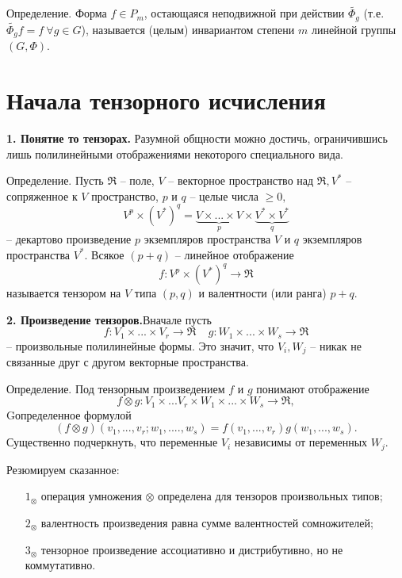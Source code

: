 \documentclass[a4paper, 12pt]{article} %
\begin{document}
Определение. Форма $f \in P_m$, остающаяся неподвижной при действии $\widetilde{\Phi_g}$ (т.е. $\widetilde{\Phi_g}f = f \ \forall g \in G$), называется (целым) инвариантом степени $m$ линейной группы $(G, \Phi)$.

\clearpage
\section*{Начала тензорного исчисления}
\textbf{1. Понятие то тензорах.} Разумной общности можно достичь, ограничившись лишь полилинейными отображениями некоторого специального вида.

Определение. Пусть $\Re$ -- поле, $V$ -- векторное пространство над $\Re, V^*$ -- сопряженное к $V$ пространство, $p$ и $q$ -- целые числа $\geq 0,$
\begin{equation}
    V^p \times (V^*)^q = \underbrace{V \times ... \times V}_{p} \times \underbrace{V^* \times V^*}_{q}
\end{equation}
-- декартово произведение $p$ экземпляров пространства $V$ и $q$ экземпляров пространства $V^*$. Всякое $(p + q)$ -- линейное отображение
\begin{equation}
    f: V^p \times (V^*)^q \to \Re
\end{equation}
называется тензором на $V$ типа $(p, q)$ и валентности (или ранга) $p + q$.

\textbf{2. Произведение тензоров.}Вначале пусть
\begin{equation}
    f: V_1 \times ... \times V_r \to \Re ~~~~~ g: W_1 \times ... \times W_s \to \Re
\end{equation}
-- произвольные полилинейные формы. Это значит, что $V_i, W_j$ -- никак не связанные друг с другом векторные пространства.

Определение. Под тензорным произведением $f$ и $g$ понимают отображение
\begin{equation}
    f \otimes g: V_1 \times ... V_r \times W_1 \times ... \times W_s \to \Re,
\end{equation}
Gопределенное формулой
\begin{equation}
    (f \otimes g)(v_1, ..., v_r; w_1, ...., w_s) = f(v_1, ..., v_r)g(w_1, ..., w_s).
\end{equation}
Существенно подчеркнуть, что переменные $V_i$ независимы от переменных $W_j$.

Резюмируем сказанное:
\begin{enumerate}
    \item [$1_\otimes$] операция умножения $\otimes$ определена для тензоров произвольных типов;
    \item [$2_\otimes$] валентность произведения равна сумме валентностей сомножителей;
    \item [$3_\otimes$] тензорное произведение ассоциативно и дистрибутивно, но не коммутативно.
\end{enumerate}
\end{document}
